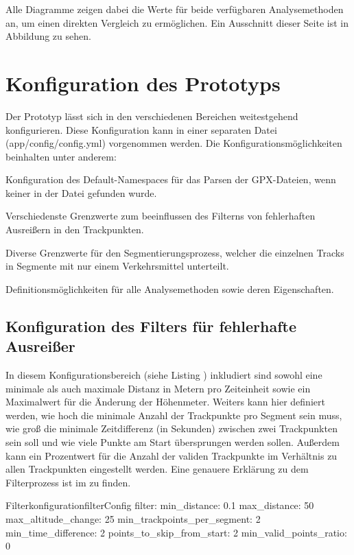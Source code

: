 Alle Diagramme zeigen dabei die Werte für beide verfügbaren Analysemethoden an, um einen direkten Vergleich zu ermöglichen. Ein Ausschnitt dieser Seite ist in Abbildung  zu sehen.


\section{Konfiguration des Prototyps}
Der Prototyp lässt sich in den verschiedenen Bereichen weitestgehend konfigurieren. Diese Konfiguration kann in einer separaten Datei (app/config/config.yml) vorgenommen werden. Die Konfigurationsmöglichkeiten beinhalten unter anderem:
\begin{pitemize}
\item Konfiguration des Default-Namespaces für das Parsen der GPX-Dateien, wenn keiner in der Datei gefunden wurde.
\item Verschiedenste Grenzwerte zum beeinflussen des Filterns von fehlerhaften Ausreißern in den Trackpunkten.
\item Diverse Grenzwerte für den Segmentierungsprozess, welcher die einzelnen Tracks in Segmente mit nur einem Verkehrsmittel unterteilt.
\item Definitionsmöglichkeiten für alle Analysemethoden sowie deren Eigenschaften.
\end{pitemize}

\subsection{Konfiguration des Filters für fehlerhafte Ausreißer}
In diesem Konfigurationsbereich (siehe Listing ) inkludiert sind sowohl eine minimale als auch maximale Distanz in Metern pro Zeiteinheit sowie ein Maximalwert für die Änderung der Höhenmeter. Weiters kann hier definiert werden, wie hoch die minimale Anzahl der Trackpunkte pro Segment sein muss, wie groß die minimale Zeitdifferenz (in Sekunden) zwischen zwei Trackpunkten sein soll und wie viele Punkte am Start übersprungen werden sollen. Außerdem kann ein Prozentwert für die Anzahl der validen Trackpunkte im Verhältnis zu allen Trackpunkten eingestellt werden. Eine genauere Erklärung zu dem Filterprozess ist im  zu finden.

\begin{code}[]{Filterkonfiguration}{filterConfig}
  filter:
    min_distance: 0.1
    max_distance: 50
    max_altitude_change: 25
    min_trackpoints_per_segment: 2
    min_time_difference: 2
    points_to_skip_from_start: 2
    min_valid_points_ratio: 0
\end{code}

